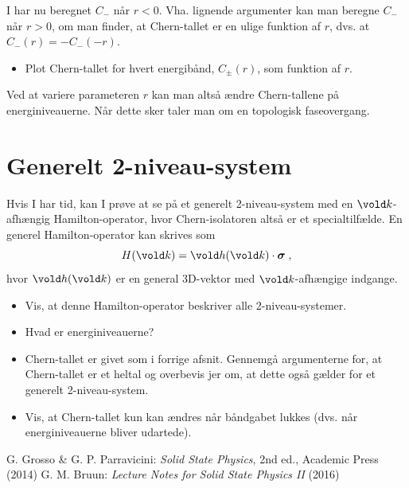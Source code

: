 \documentclass[11pt, a4paper]{article}
\let\v\vold
\newcommand{\v}[1]{{\bf{#1}}}
\begin{document}
I har nu beregnet $C_-$ når $r < 0$. Vha. lignende argumenter kan man
beregne $C_-$ når $r > 0$, om man finder, at Chern-tallet er en ulige
funktion af $r$, dvs. at $C_- (r) = - C_- (-r)$.

\begin{itemize}
\item Plot Chern-tallet for hvert energibånd, $C_\pm(r)$, som
  funktion af $r$.
\end{itemize}

Ved at variere parameteren $r$ kan man altså ændre Chern-tallene på
energiniveauerne. Når dette sker taler man om en topologisk
faseovergang.


\section{Generelt 2-niveau-system}

Hvis I har tid, kan I prøve at se på et generelt 2-niveau-system med
en $\v k$-afhængig Hamilton-operator, hvor Chern-isolatoren altså er
et specialtilfælde. En generel Hamilton-operator kan skrives som
\begin{equation}
  \label{eq:generel-hamilton}
  H (\v k) = \v h (\v k) \cdot \boldsymbol{\sigma} \; ,
\end{equation}
hvor $\v h (\v k)$ er en general 3D-vektor med $\v k$-afhængige
indgange.

\begin{itemize}
\item Vis, at denne Hamilton-operator beskriver alle
  2-niveau-systemer.
\item Hvad er energiniveauerne?
\item Chern-tallet er givet som i forrige afsnit. Gennemgå
  argumenterne for, at Chern-tallet er et heltal og overbevis jer om,
  at dette også gælder for et generelt 2-niveau-system.
\item Vis, at Chern-tallet kun kan ændres når båndgabet lukkes
  (dvs. når energiniveauerne bliver udartede).
\end{itemize}





\begin{thebibliography}{9}
    G. Grosso \& G. P.  Parravicini: {\it Solid State Physics}, 2nd ed.,
    Academic Press (2014)
   G. M. Bruun: {\it Lecture Notes for Solid State Physics
      II} (2016)
\end{thebibliography}
\end{document}
